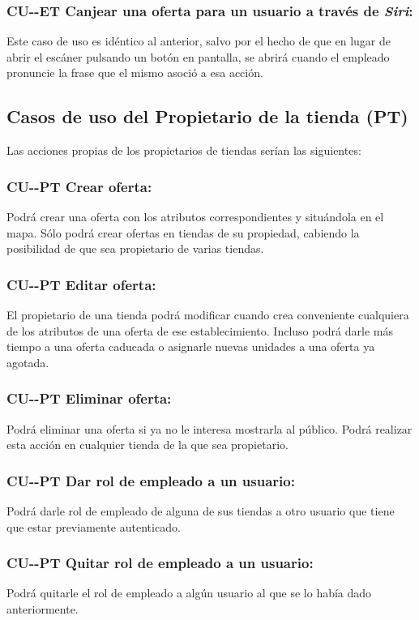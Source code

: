 \subsubsection*{CU-\theUseCase-ET Canjear una oferta para un usuario a través de \textit{Siri}:} Este caso de uso es idéntico al anterior, salvo por el hecho de que en lugar de abrir el escáner pulsando un botón en pantalla, se abrirá cuando el empleado pronuncie la frase que el mismo asoció a esa acción.
\subsection*{Casos de uso del Propietario de la tienda (PT)}
Las acciones propias de los propietarios de tiendas serían las siguientes:
\subsubsection*{CU-\theUseCase-PT Crear oferta:}
Podrá crear una oferta con los atributos correspondientes y situándola en el mapa. Sólo podrá crear ofertas en tiendas de su propiedad, cabiendo la posibilidad de que sea propietario de varias tiendas.
\subsubsection*{CU-\theUseCase-PT Editar oferta:}
El propietario de una tienda podrá modificar cuando crea conveniente cualquiera de los atributos de una oferta de ese establecimiento. Incluso podrá darle más tiempo a una oferta caducada o asignarle nuevas unidades a una oferta ya agotada.
\subsubsection*{CU-\theUseCase-PT Eliminar oferta:}
Podrá eliminar una oferta si ya no le interesa mostrarla al público. Podrá realizar esta acción en cualquier tienda de la que sea propietario.
\subsubsection*{CU-\theUseCase-PT Dar rol de empleado a un usuario:} Podrá darle rol de empleado de alguna de sus tiendas a otro usuario que tiene que estar previamente autenticado.
\subsubsection*{CU-\theUseCase-PT Quitar rol de empleado a un usuario:} Podrá quitarle el rol de empleado a algún usuario al que se lo había dado anteriormente.
